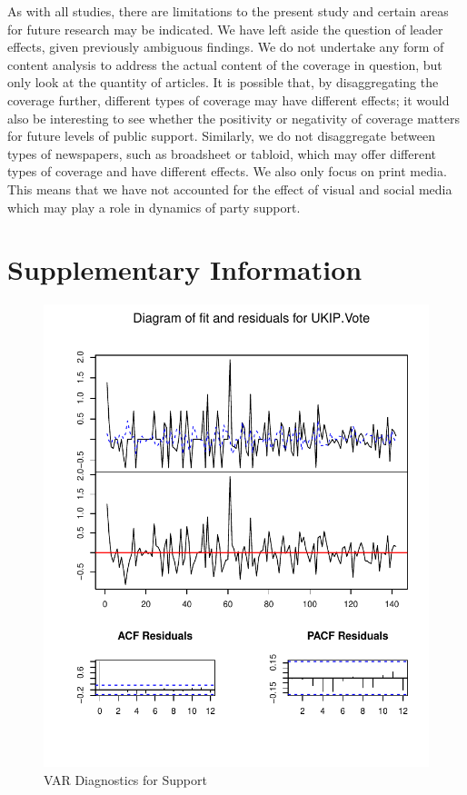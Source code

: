 \documentclass[12pt,]{article}
\makeatletter
\def\maxwidth{\ifdim\Gin@nat@width>\linewidth\linewidth
\else\Gin@nat@width\fi}
\let\Oldincludegraphics\includegraphics
\renewcommand{\includegraphics}[1]{\Oldincludegraphics[width=\maxwidth]{#1}}
\makeatother
\begin{document}
As with all studies, there are limitations to the present study and
certain areas for future research may be indicated. We have left aside
the question of leader effects, given previously ambiguous findings. We
do not undertake any form of content analysis to address the actual
content of the coverage in question, but only look at the quantity of
articles. It is possible that, by disaggregating the coverage further,
different types of coverage may have different effects; it would also be
interesting to see whether the positivity or negativity of coverage
matters for future levels of public support. Similarly, we do not
disaggregate between types of newspapers, such as broadsheet or tabloid,
which may offer different types of coverage and have different effects.
We also only focus on print media. This means that we have not accounted
for the effect of visual and social media which may play a role in
dynamics of party support.

\newpage

\section{Supplementary Information}\label{supplementary-information}

\begin{figure}[htbp]
\centering
\includegraphics{ukip_media_files/var-plot-support.pdf}
\caption{VAR Diagnostics for Support}
\end{figure}
\end{document}
